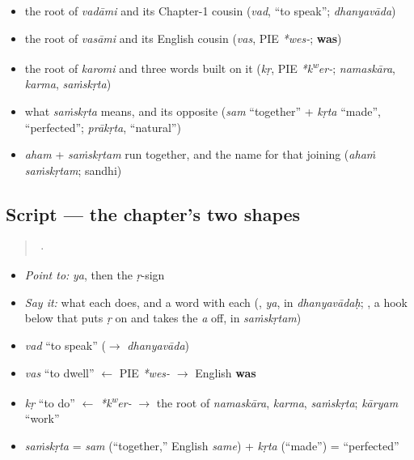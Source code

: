 \begin{itemize}
\raggedright
  \item the root of \emph{vadāmi} and its Chapter-1 cousin (\emph{vad}, \textquotedblleft{}to speak\textquotedblright{}; \emph{dhanyavāda})
  \item the root of \emph{vasāmi} and its English cousin (\emph{vas}, PIE \emph{*wes-}; \textbf{was})
  \item the root of \emph{karomi} and three words built on it (\emph{kṛ}, PIE \emph{*k\textsuperscript{w}er-}; \emph{namaskāra}, \emph{karma}, \emph{saṁskṛta})
  \item what \emph{saṁskṛta} means, and its opposite (\emph{sam} \textquotedblleft{}together\textquotedblright{} + \emph{kṛta} \textquotedblleft{}made\textquotedblright{}, \textquotedblleft{}perfected\textquotedblright{}; \emph{prākṛta}, \textquotedblleft{}natural\textquotedblright{})
  \item \emph{aham} + \emph{saṁskṛtam} run together, and the name for that joining (\emph{ahaṁ saṁskṛtam}; sandhi)
\end{itemize}

\subsection*{Script — the chapter's two shapes}
\begin{quote}
 · 
\end{quote}

\begin{itemize}
\raggedright
  \item \emph{Point to:} \emph{ya}, then the \emph{ṛ}-sign
  \item \emph{Say it:} what each does, and a word with each (\textbf{}, \emph{ya}, in \emph{dhanyavādaḥ}; \textbf{}, a hook below that puts \emph{ṛ} on and takes the \emph{a} off, in \emph{saṁskṛtam})
\end{itemize}

\begin{grammarlens}[title={What you've built: the roots you now carry}]
\begin{itemize}
\raggedright
  \item \emph{vad} \textquotedblleft{}to speak\textquotedblright{} ($\to$ \emph{dhanyavāda})
  \item \emph{vas} \textquotedblleft{}to dwell\textquotedblright{} $\leftarrow$ PIE \emph{*wes-} $\to$ English \textbf{was}
  \item \emph{kṛ} \textquotedblleft{}to do\textquotedblright{} $\leftarrow$ \emph{*k\textsuperscript{w}er-} $\to$ the root of \emph{namaskāra}, \emph{karma}, \emph{saṁskṛta}; \emph{kāryam} \textquotedblleft{}work\textquotedblright{}
  \item \emph{saṁskṛta} = \emph{sam} (\textquotedblleft{}together,\textquotedblright{} English \emph{same}) + \emph{kṛta} (\textquotedblleft{}made\textquotedblright{}) = \textquotedblleft{}perfected\textquotedblright{}
\end{itemize}
\end{grammarlens}

